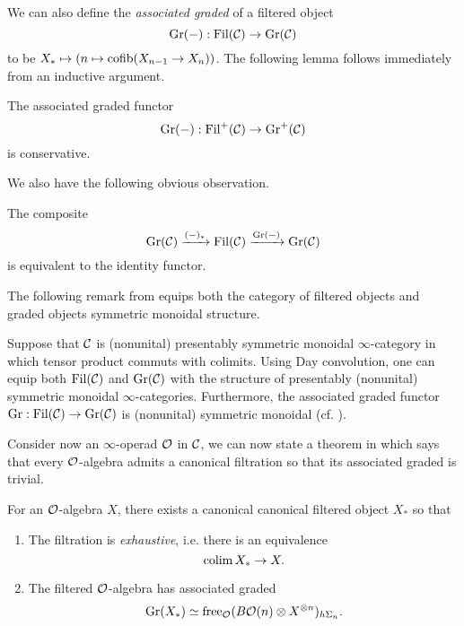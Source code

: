 We can also define the \emph{associated graded} of a filtered object 
$$
\operatorname{\operatorname{Gr}}(-):
\operatorname{\operatorname{Fil}}({\mathcal{C}})
\to 
\operatorname{\operatorname{Gr}}({\mathcal{C}})
$$
to be $X_* \mapsto (n \mapsto \operatorname{cofib}(X_{n-1} \to X_{n}))$.
The following lemma follows immediately from an inductive argument.
\begin{lemma}
\label{Ass-gr is conservative}
	The associated graded functor $$\operatorname{\operatorname{Gr}}(-):
\operatorname{\operatorname{Fil}}^{+}({\mathcal{C}})
\to 
\operatorname{Gr}^{+}({\mathcal{C}})
$$
is conservative.
\end{lemma}

We also have the following obvious observation.
\begin{lemma}
	The composite 
	\[
	\operatorname{\operatorname{Gr}}({\mathcal{C}}) \xrightarrow{(-)_*} 
	\operatorname{\operatorname{Fil}}({\mathcal{C}})
	\xrightarrow{\operatorname{\operatorname{Gr}}(-)} 
	\operatorname{\operatorname{Gr}}({\mathcal{C}}) 
	\]
	is equivalent to the identity functor.
\end{lemma}

The following remark from \cite{Brantner-Mathew} equips both the category of filtered objects and graded objects symmetric monoidal structure.
\begin{remark}
\cite[Definition 2.5]{Brantner-Mathew}
Suppose that ${\mathcal{C}}$ is (nonunital) presentably symmetric monoidal $\infty$-category in which tensor product commuts with colimits.
Using Day convolution, one can equip both $\operatorname{\operatorname{Fil}}({\mathcal{C}})$ and $\operatorname{\operatorname{Gr}}({\mathcal{C}})$ with the structure of presentably (nonunital) symmetric monoidal $\infty$-categories. Furthermore, the associated graded functor $\operatorname{\operatorname{Gr}} : \operatorname{\operatorname{Fil}}({\mathcal{C}}) \to \operatorname{\operatorname{Gr}}({\mathcal{C}})$ is (nonunital) symmetric monoidal (cf. \cite[Sec. 2.23]{Glasman}).
\end{remark}

Consider now an $\infty$-operad ${\mathcal{O}}$ in ${\mathcal{C}}$, we can now state a theorem in \cite{Heuts_Koszul} which says that every ${\mathcal{O}}$-algebra admits a canonical filtration so that its associated graded is trivial.
\begin{theorem}
\label{Canonical grading on an O-algebra}
\cite[Theorem 5.2 (2)]{Heuts_Koszul}
For an ${\mathcal{O}}$-algebra $X$, there exists a canonical canonical filtered object $X_{*}$ so that 
\begin{enumerate}
    \item The filtration is \emph{exhaustive}, i.e. there is an equivalence
    $$
    \operatorname{colim} X_{*} \to X.
    $$
    \item The filtered ${\mathcal{O}}$-algebra has associated graded
    $$
    \operatorname{\operatorname{Gr}}(X_*)\simeq \operatorname{free}_{{\mathcal{O}}}(B{\mathcal{O}}(n)\otimes X^{\otimes n })_{h\Sigma_n}.
    $$
\end{enumerate}


\end{theorem}



